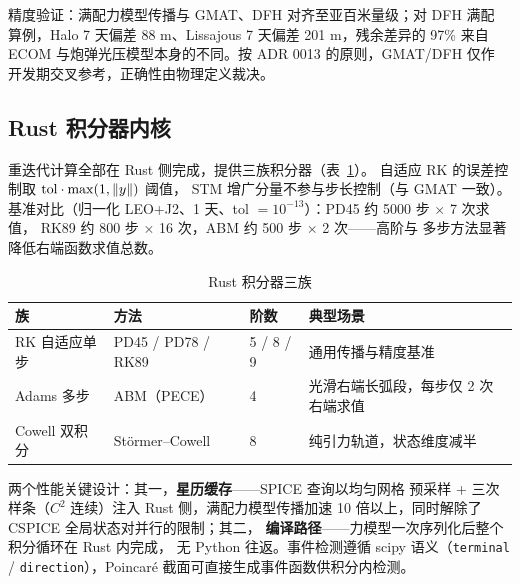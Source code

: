 精度验证：满配力模型传播与 GMAT、DFH 对齐至亚百米量级；对 DFH 满配
算例，Halo 7 天偏差 88 m、Lissajous 7 天偏差 201 m，残余差异的 97\%
来自 ECOM 与炮弹光压模型本身的不同。按 ADR 0013 的原则，GMAT/DFH 仅作
开发期交叉参考，正确性由物理定义裁决。

\subsection{Rust 积分器内核}

重迭代计算全部在 Rust 侧完成，提供三族积分器（表~\ref{tab:integrators}）。
自适应 RK 的误差控制取 $\mathrm{tol}\cdot\max(1, \left\lVert y \right\rVert)$ 阈值，
STM 增广分量不参与步长控制（与 GMAT 一致）。基准对比（归一化
LEO+J2、1 天、tol $=10^{-13}$）：PD45 约 5000 步 $\times$ 7 次求值，
RK89 约 800 步 $\times$ 16 次，ABM 约 500 步 $\times$ 2 次——高阶与
多步方法显著降低右端函数求值总数。

\begin{table}[htbp]
\centering\small
\caption{Rust 积分器三族}
\label{tab:integrators}
\begin{tabularx}{\textwidth}{@{}lllX@{}}
\toprule
\textbf{族} & \textbf{方法} & \textbf{阶数} & \textbf{典型场景} \\
\midrule
RK 自适应单步 & PD45 / PD78 / RK89 & 5 / 8 / 9 & 通用传播与精度基准 \\
Adams 多步 & ABM（PECE） & 4 & 光滑右端长弧段，每步仅 2 次右端求值 \\
Cowell 双积分 & Störmer--Cowell & 8 & 纯引力轨道，状态维度减半 \\
\bottomrule
\end{tabularx}
\end{table}

两个性能关键设计：其一，\textbf{星历缓存}——SPICE 查询以均匀网格
预采样 + 三次样条（$C^2$ 连续）注入 Rust 侧，满配力模型传播加速
10 倍以上，同时解除了 CSPICE 全局状态对并行的限制；其二，
\textbf{编译路径}——力模型一次序列化后整个积分循环在 Rust 内完成，
无 Python 往返。事件检测遵循 scipy 语义（\texttt{terminal} /
\texttt{direction}），Poincaré 截面可直接生成事件函数供积分内检测。
